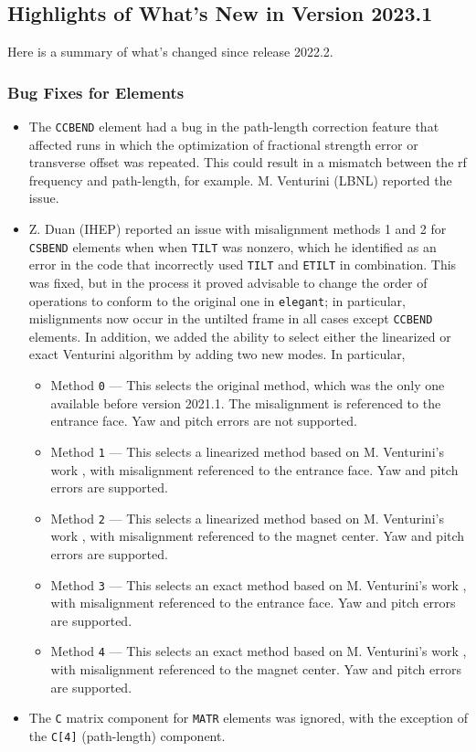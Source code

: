 \documentclass[11pt]{article}
\begin{document}
\subsection{Highlights of What's New in Version 2023.1}

Here is a summary of what's changed since release 2022.2. 

\subsubsection{Bug Fixes for Elements}

\begin{itemize}
\item The \verb|CCBEND| element had a bug in the path-length correction feature that affected runs in which
  the optimization of fractional strength error or transverse offset was repeated. This could result in 
  a mismatch between the rf frequency and path-length, for example.
  M. Venturini (LBNL) reported the issue.
\item Z. Duan (IHEP) reported an issue with misalignment methods 1 and 2 for \verb|CSBEND| elements when
  when \verb|TILT| was nonzero, which he identified as an error in the code that incorrectly used
  \verb|TILT| and \verb|ETILT| in combination. This was fixed, but in the process it proved advisable to
  change the order of operations to conform to the original one in {\tt elegant}; in particular,
  mislignments now occur in the untilted frame in all cases except \verb|CCBEND| elements.
  In addition, we added the ability to select either the linearized or exact Venturini algorithm by
  adding two new modes. In particular,
  \begin{itemize}
  \item Method \verb|0| --- This selects the original method, which was
    the only one available before version 2021.1. The misalignment is
    referenced to the entrance face. Yaw and pitch errors are not supported.
  \item Method \verb|1| --- This selects a linearized method based on M. Venturini's
    work \cite{Venturini2021}, with misalignment referenced to the entrance face.
    Yaw and pitch errors are supported.
  \item Method \verb|2| --- This selects a linearized method based on M. Venturini's
    work \cite{Venturini2021}, with misalignment referenced to the magnet center.
    Yaw and pitch errors are supported.
  \item Method \verb|3| --- This selects an  exact method based on M. Venturini's
    work \cite{Venturini2021}, with misalignment referenced to the entrance face.
    Yaw and pitch errors are supported.
  \item Method \verb|4| --- This selects an exact method based on M. Venturini's
    work \cite{Venturini2021}, with misalignment referenced to the magnet center.
    Yaw and pitch errors are supported.
  \end{itemize}
\item The \verb|C| matrix component for \verb|MATR| elements was ignored, with the exception of the 
  \verb|C[4]| (path-length) component. 
\end{itemize}
\end{document}
